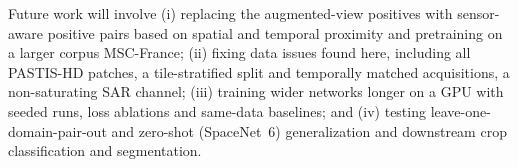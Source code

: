 \documentclass[conference]{IEEEtran}
\begin{document}
Future work will involve (i) replacing the augmented-view positives with sensor-aware positive pairs based on spatial and temporal proximity and pretraining on a larger corpus MSC-France; (ii) fixing data issues found here, including all PASTIS-HD patches, a tile-stratified split and temporally matched acquisitions, a non-saturating SAR channel; (iii) training wider networks longer on a GPU with seeded runs, loss ablations and same-data baselines; and (iv) testing leave-one-domain-pair-out and zero-shot (SpaceNet~6) generalization and downstream crop classification and segmentation.



\end{document}
